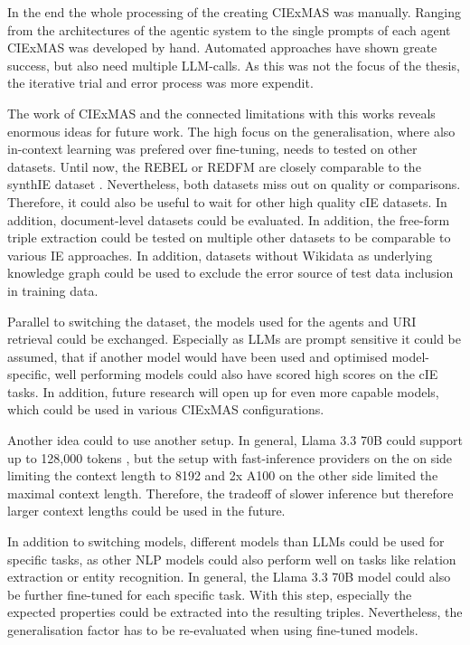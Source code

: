 \documentclass[a4paper,oneside,bibliography=totoc]{scrbook}
\begin{document}
In the end the whole processing of the creating CIExMAS was manually. Ranging from the architectures of the agentic system to the single prompts of each agent CIExMAS was developed by hand. Automated approaches have shown greate success, but also need multiple \ac{LLM}-calls. As this was not the focus of the thesis, the iterative trial and error process was more expendit.

The work of CIExMAS and the connected limitations with this works reveals enormous ideas for future work. The high focus on the generalisation, where also in-context learning was prefered over fine-tuning, needs to tested on other datasets. Until now, the REBEL or REDFM are closely comparable to the synthIE dataset \cite{HuguetCabot2021,Cabot2023}. Nevertheless, both datasets miss out on quality or comparisons. Therefore, it could also be useful to wait for other high quality \ac{cIE} datasets. In addition, document-level datasets could be evaluated. In addition, the free-form triple extraction could be tested on multiple other datasets to be comparable to various \ac{IE} approaches. In addition, datasets without Wikidata as underlying knowledge graph could be used to exclude the error source of test data inclusion in training data.

Parallel to switching the dataset, the models used for the agents and URI retrieval could be exchanged. Especially as \acp{LLM} are prompt sensitive it could be assumed, that if another model would have been used and optimised model-specific, well performing models could also have scored high scores on the \ac{cIE} tasks. In addition, future research will open up for even more capable models, which could be used in various CIExMAS configurations.

Another idea could to use another setup. In general, Llama 3.3 70B could support up to 128,000 tokens \cite{Meta2024}, but the setup with fast-inference providers on the on side limiting the context length to 8192 and 2x A100 on the other side limited the maximal context length. Therefore, the tradeoff of slower inference but therefore larger context lengths could be used in the future.

In addition to switching models, different models than \acp{LLM} could be used for specific tasks, as other \ac{NLP} models could also perform well on tasks like relation extraction or entity recognition. In general, the Llama 3.3 70B model could also be further fine-tuned for each specific task. With this step, especially the expected properties could be extracted into the resulting triples. Nevertheless, the generalisation factor has to be re-evaluated when using fine-tuned models.
\end{document}
